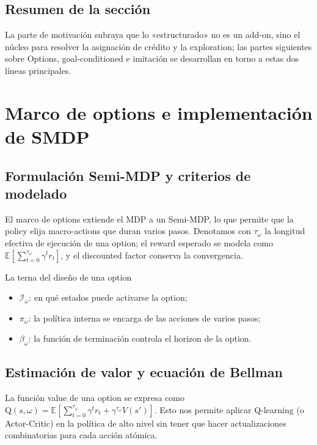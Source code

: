 \documentclass[a4paper]{article}
\begin{document}
\subsection{Resumen de la sección}

La parte de motivación subraya que lo «estructurado» no es un add-on, sino el núcleo para resolver la asignación de crédito y la exploration; las partes siguientes sobre Options, goal-conditioned e imitación se desarrollan en torno a estas dos líneas principales.
\section{Marco de options e implementación de SMDP}

\subsection{Formulación Semi-MDP y criterios de modelado}

El marco de options extiende el MDP a un Semi-MDP, lo que permite que la policy elija macro-actions que duran varios pasos. Denotamos con $\tau_\omega$ la longitud efectiva de ejecución de una option; el reward esperado se modela como $\mathbb{E}\left[\sum_{t=0}^{\tau_\omega} \gamma^t r_t\right]$, y el discounted factor conserva la convergencia.

\begin{importantbox}{La terna del diseño de una option}
\begin{itemize}
    \item $\mathcal{I}_\omega$: en qué estados puede activarse la option;
    \item $\pi_\omega$: la política interna se encarga de las acciones de varios pasos;
    \item $\beta_\omega$: la función de terminación controla el horizon de la option.
\end{itemize}
\end{importantbox}

\subsection{Estimación de valor y ecuación de Bellman}

La función value de una option se expresa como \(\mathrm{Q}(s, \omega) = \mathbb{E}\left[\sum_{t=0}^{\tau_\omega} \gamma^t r_t + \gamma^{\tau_\omega} V(s')\right]\). Esto nos permite aplicar Q-learning (o Actor-Critic) en la política de alto nivel sin tener que hacer actualizaciones combinatorias para cada acción atómica.
\end{document}
